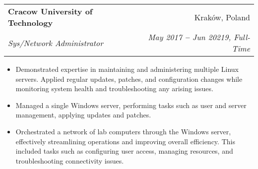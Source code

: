 \documentclass[letterpaper,11pt]{article}
\makeatletter
\newcommand{\resumeItem}[1]{
  \item\small{
    {#1 \vspace{-2pt}}
  }
}
\newcommand{\resumeSubheading}[4]{
  \vspace{-2pt}\item
    \begin{tabular*}{0.97\textwidth}[t]{l@{\extracolsep{\fill}}r}
      \textbf{#1} & #2 \\
      \textit{\small#3} & \textit{\small #4} \\
    \end{tabular*}\vspace{-7pt}
}
\newcommand{\resumeItemListStart}{\begin{itemize}}
\newcommand{\resumeItemListEnd}{\end{itemize}\vspace{-5pt}}
\makeatother
\begin{document}
    \resumeSubheading
      {Cracow University of Technology}{Kraków, Poland}
      {Sys/Network Administrator}{May 2017 \textbf{--} Jun 20219, Full-Time}
        \resumeItemListStart
            \resumeItem{Demonstrated expertise in maintaining and administering multiple Linux servers. Applied regular updates, patches, and configuration changes while monitoring system health and troubleshooting any arising issues.}
            \resumeItem{Managed a single Windows server, performing tasks such as user and server management, applying updates and patches.}
            \resumeItem{Orchestrated a network of lab computers through the Windows server, effectively streamlining operations and improving overall efficiency. This included tasks such as configuring user access, managing resources, and troubleshooting connectivity issues.}
        \resumeItemListEnd
    

    
\end{document}
